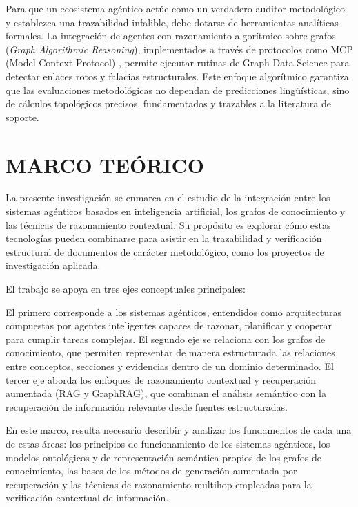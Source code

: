 \documentclass[12pt,letterpaper]{article}
\begin{document}
Para que un ecosistema agéntico actúe como un verdadero auditor metodológico y establezca una trazabilidad infalible, debe dotarse de herramientas analíticas formales. La integración de agentes con razonamiento algorítmico sobre grafos (\textit{Graph Algorithmic Reasoning}), implementados a través de protocolos como MCP (Model Context Protocol) \citep{Shi2025}, permite ejecutar rutinas de Graph Data Science para detectar enlaces rotos y falacias estructurales. Este enfoque algorítmico garantiza que las evaluaciones metodológicas no dependan de predicciones lingüísticas, sino de cálculos topológicos precisos, fundamentados y trazables a la literatura de soporte.


\newpage
\section{MARCO TEÓRICO}
\vspace{-0.5cm}

La presente investigación se enmarca en el estudio de la integración entre los sistemas agénticos basados en inteligencia artificial, los grafos de conocimiento y las técnicas de razonamiento contextual. Su propósito es explorar cómo estas tecnologías pueden combinarse para asistir en la trazabilidad y verificación estructural de documentos de carácter metodológico, como los proyectos de investigación aplicada.

El trabajo se apoya en tres ejes conceptuales principales:

El primero corresponde a los sistemas agénticos, entendidos como arquitecturas compuestas por agentes inteligentes capaces de razonar, planificar y cooperar para cumplir tareas complejas. El segundo eje se relaciona con los grafos de conocimiento, que permiten representar de manera estructurada las relaciones entre conceptos, secciones y evidencias dentro de un dominio determinado. El tercer eje aborda los enfoques de razonamiento contextual y recuperación aumentada (RAG y GraphRAG), que combinan el análisis semántico con la recuperación de información relevante desde fuentes estructuradas.

En este marco, resulta necesario describir y analizar los fundamentos de cada una de estas áreas: los principios de funcionamiento de los sistemas agénticos, los modelos ontológicos y de representación semántica propios de los grafos de conocimiento, las bases de los métodos de generación aumentada por recuperación y las técnicas de razonamiento multihop empleadas para la verificación contextual de información.
\end{document}
